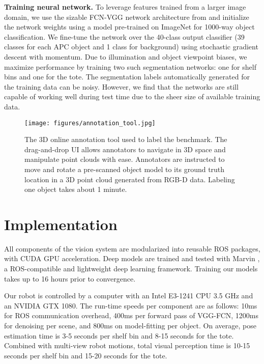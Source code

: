\documentclass[letterpaper, 10 pt, conference]{ieeeconf}  %
\newcommand{\myparagraph}[1]{\vspace{0.1in}\noindent\textbf{#1}}
\begin{document}
\myparagraph{Training neural network.} To leverage features trained from a larger image domain, we use the sizable FCN-VGG network architecture from \cite{simonyan2014very} and initialize the network weights using a model pre-trained on ImageNet for 1000-way object classification. We fine-tune the network over the 40-class output classifier (39 classes for each APC object and 1 class for background) using stochastic gradient descent with momentum. Due to illumination and object viewpoint biases, we maximize performance by training two such segmentation networks: one for shelf bins and one for the tote. The segmentation labels automatically generated for the training data can be noisy. However, we find that the networks are still capable of working well during test time due to the sheer size of available training data.

\begin{figure}[t]
\vspace{2mm}
\centering
  \texttt{[image: figures/annotation\_tool.jpg]}
  \caption{The 3D online annotation tool used to label the benchmark. The drag-and-drop UI allows annotators to navigate in 3D space and manipulate point clouds with ease. Annotators are instructed to move and rotate a pre-scanned object model to its ground truth location in a 3D point cloud generated from RGB-D data. Labeling one object takes about 1 minute.}
  \label{fig:tool}
  \vspace{-5mm}
\end{figure}



\section{Implementation} %
All components of the vision system are modularized into reusable ROS packages, with CUDA GPU acceleration. Deep models are trained and tested with Marvin \cite{Marvin20151110}, a ROS-compatible and lightweight deep learning framework. Training our models takes up to 16 hours prior to convergence. %

Our robot is controlled by a computer with an Intel E3-1241 CPU 3.5 GHz and an NVIDIA GTX 1080. The run-time speeds per component are as follows: 10ms for ROS communication overhead, 400ms per forward pass of VGG-FCN, 1200ms for denoising per scene, and 800ms on model-fitting per object. On average, pose estimation time is 3-5 seconds per shelf bin and 8-15 seconds for the tote. Combined with multi-view robot motions, total visual perception time is 10-15 seconds per shelf bin and 15-20 seconds for the tote.
\end{document}
